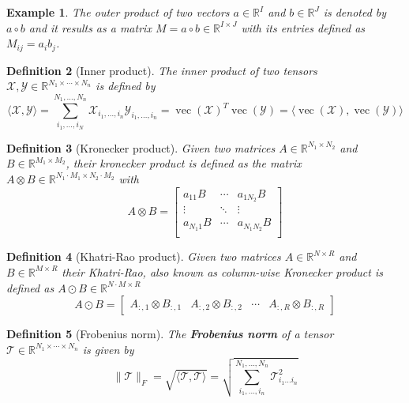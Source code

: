 \documentclass[11pt,a4paper,openright,oneside]{book}
\numberwithin{equation}{section}
\newtheorem{defn0}{Definition}[chapter]
\newtheorem{example0}[defn0]{Example}
\newenvironment{definition}{ \begin{defn0}}{\end{defn0}}
\newenvironment{example}{ \begin{example0}\rm}{\end{example0}}
\DeclareMathOperator{\vectorize}{vec}
\begin{document}
\begin{example}
The outer product of two vectors $a \in \mathbb{R}^I$ and $b \in \mathbb{R}^J$ is denoted by $a \circ b$ and it results
as a matrix $M = a \circ b \in \mathbb{R}^{I \times J}$ with its entries defined as $M_{ij} = a_i b_j$.
\end{example}


\begin{definition}[Inner product]
The inner product of two tensors $\mathcal{X}, \mathcal{Y} \in \mathbb{R}^{N_1 \times \cdots \times N_n}$ is defined by
$$\langle \mathcal{X},\mathcal{Y} \rangle = \sum_{i_1, \dots, i_N}^{N_1, \dots, N_n} \mathcal{X}_{i_1, \dots, i_n} \mathcal{Y}_{i_1, \dots, i_n} = 
\vectorize(\mathcal{X})^T \vectorize(\mathcal{Y}) = \langle \vectorize(\mathcal{X}), \vectorize(\mathcal{Y}) \rangle$$
\end{definition}


\begin{definition}[Kronecker product]
     Given two matrices $A \in \mathbb{R}^{N_1 \times N_2}$ and $B \in \mathbb{R}^{M_1 \times M_2}$,
    their kronecker product is defined as the matrix $A \otimes B \in \mathbb{R}^{N_1 \cdot M_1 \times N_2 \cdot M_2}$ with
    $$A \otimes B = \begin{bmatrix}
        a_{11}B & \cdots & a_{1N_2}B \\ 
        \vdots & \ddots & \vdots \\
        a_{N_1 1}B & \cdots & a_{N_1 N_2}B \\
    \end{bmatrix}$$
\end{definition}

\begin{definition}[Khatri-Rao product]
     Given two matrices $A \in \mathbb{R}^{N \times R}$ and $B \in \mathbb{R}^{M \times R}$ their
Khatri-Rao, also known as column-wise Kronecker product is defined as $A \odot B \in \mathbb{R}^{N \cdot M \times R}$
    $$ A \odot B = \begin{bmatrix} A_{:,1} \otimes B_{:,1} & A_{:,2} \otimes B_{:,2} & \cdots & A_{:,R} \otimes B_{:,R}  \end{bmatrix}$$
        

\end{definition}

\begin{definition}[Frobenius norm]
The \textbf{Frobenius norm} of a tensor $\mathcal{T} \in \mathbb{R}^{N_1 \times \cdots \times N_n}$ is given by
$$\|\mathcal{T}\|_F = \sqrt{\langle \mathcal{T}, \mathcal{T} \rangle} = \sqrt{\sum_{i_1, \dots, i_n}^{N_1, \dots, N_n}
\mathcal{T}_{i_1 \dots i_n}^2}$$
\end{definition}
\end{document}
